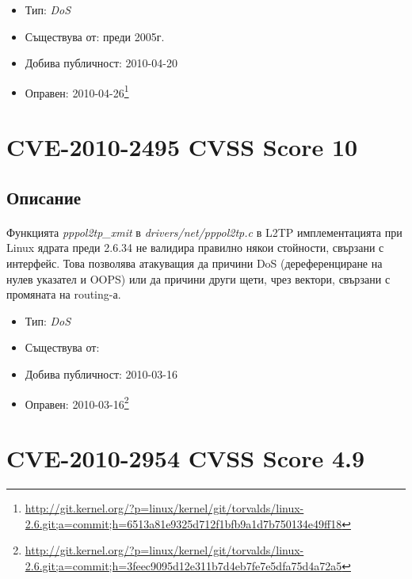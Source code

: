 \documentclass[a4paper,12pt,leqno]{article}
\begin{document}
\begin{itemize}
    \item Тип: \textit{DoS}
    \item Съществува от: преди 2005г.
  	\item Добива публичност: 2010-04-20
    \item Оправен: 2010-04-26\footnote{\url{http://git.kernel.org/?p=linux/kernel/git/torvalds/linux-2.6.git;a=commit;h=6513a81e9325d712f1bfb9a1d7b750134e49ff18}}
\end{itemize}


\section{CVE-2010-2495 CVSS Score 10}
\subsection{Описание}
\paragraph{}

Функцията \textit{pppol2tp\_xmit} в \textit{drivers/net/pppol2tp.c} в L2TP имплементацията при Linux ядрата преди 2.6.34 не валидира правилно някои стойности, свързани с интерфейс. Това позволява атакуващия да причини DoS (дереференциране на нулев указател и OOPS) или да причини други щети, чрез вектори, свързани с промяната на routing-а.

\begin{itemize}
    \item Тип: \textit{DoS}
    \item Съществува от: 
  	\item Добива публичност: 2010-03-16
    \item Оправен: 2010-03-16\footnote{\url{http://git.kernel.org/?p=linux/kernel/git/torvalds/linux-2.6.git;a=commit;h=3feec9095d12e311b7d4eb7fe7e5dfa75d4a72a5}}
\end{itemize}

\section{CVE-2010-2954 CVSS Score 4.9}
\end{document}
